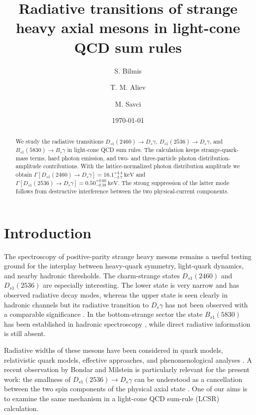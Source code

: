 \documentclass[aps,prd,preprint,nofootinbib,superscriptaddress]{revtex4-2}
\newcommand{\Ds}{D_s}
\newcommand{\Dsone}{D_{s1}}
\newcommand{\Bs}{B_s}
\newcommand{\Bsone}{B_{s1}}
\newcommand{\keV}{\mathrm{keV}}
\begin{document}
\title{Radiative transitions of strange heavy axial mesons in light-cone QCD sum rules}

\author{S. Bilmis}
\author{T. M. Aliev}
\author{M. Savci}

\date{\today}

\begin{abstract}
We study the radiative transitions
$\Dsone(2460)\to \Ds\gamma$, $\Dsone(2536)\to \Ds\gamma$, and
$\Bsone(5830)\to \Bs\gamma$ in light-cone QCD sum rules.  The calculation keeps
strange-quark-mass terms, hard photon emission, and two- and three-particle
photon distribution-amplitude contributions.  With the lattice-normalized
photon distribution amplitude we obtain
$\Gamma[\Dsone(2460)\to\Ds\gamma]=16.1^{+4.4}_{-3.7}~\keV$ and
$\Gamma[\Dsone(2536)\to\Ds\gamma]=0.50^{+0.60}_{-0.38}~\keV$.
The strong suppression of the latter mode follows from destructive interference
between the two physical-current components.
\end{abstract}

\maketitle

\section{Introduction}

The spectroscopy of positive-parity strange heavy mesons remains a useful
testing ground for the interplay between heavy-quark symmetry, light-quark
dynamics, and nearby hadronic thresholds.  The charm-strange states
$\Dsone(2460)$ and $\Dsone(2536)$ are especially interesting.  The lower state
is very narrow and has observed radiative decay modes, whereas the upper state
is seen clearly in hadronic channels but its radiative transition to
$\Ds\gamma$ has not been observed with a comparable significance
\cite{BaBar:2006eep,BaBar:2011zpy,Belle:2007hue}.  In the bottom-strange
sector the state $\Bsone(5830)$ has been established in hadronic spectroscopy
\cite{CMS:2018qdl}, while direct radiative information is still absent.

Radiative widths of these mesons have been considered in quark models,
relativistic quark models, effective approaches, and phenomenological analyses
\cite{Godfrey:2005ww,Goity:2000dk,Radford:2009bs,Green:2016occ,Chen:2020ejk,
Korner:1992pz,Li:2021qgz,Godfrey:2016nwn,Lu:2016bbk,Bondar:2023mua,
Bondar:2025smw}.  A recent observation by Bondar and Milstein is particularly
relevant for the present work: the smallness of
$\Dsone(2536)\to\Ds\gamma$ can be understood as a cancellation between the two
spin components of the physical axial state \cite{Bondar:2023mua,
Bondar:2025smw}.  One of our aims is to examine the same mechanism in a
light-cone QCD sum-rule (LCSR) calculation.
\end{document}
